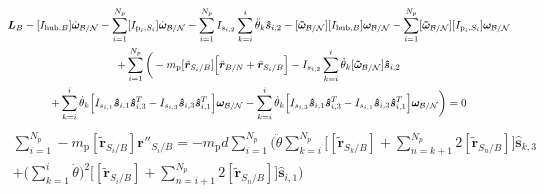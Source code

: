 \begin{multline}
	\bm L_B -[I_{\text{hub},B}] \dot{\bm\omega}_{\cal B/N} - \sum\limits_{i=1}^{N_p}[I_{\text{p}_i,S_i}] \dot{\bm\omega}_{\cal B/N} - \sum\limits_{i=1}^{N_p} I_{s_{i,2}}\sum^{i}_{k=i} \ddot{\theta}_k \bm{\hat{s}}_{i,2} -[\bm{\tilde{\omega}}_{\cal B/N}] [I_{\text{hub},B}] \bm\omega_{\cal B/N} - \sum\limits_{i=1}^{N_p}[\bm{\tilde{\omega}}_{\cal B/N}] [I_{\text{p}_i,S_i}] \bm\omega_{\cal B/N} \\
	+ \sum\limits_{i=1}^{N_p}\bigg(- m_{\text{p}} [\tilde{{\bm r}}_{S_{i}/B}] \Big[\ddot{\bm r}_{B/N} + \ddot{\bm r}_{S_{i}/B}\Big]
	- I_{s_{i,2}} \sum^{i}_{k=i} \dot{\theta}_k [\bm{\tilde{\omega}}_{\cal B/N}] \bm{\hat{s}}_{i,2} \\
	+ \sum^{i}_{k=i} \dot{\theta}_k \Big[I_{s_{i,1}}\bm{\hat{s}}_{i,1} \bm{\hat{s}}_{i,3}^T -  I_{s_{i,3}} \bm{\hat{s}}_{i,3} \bm{\hat{s}}_{i,1}^T\Big] \bm\omega_{\cal B/N} -  \sum^{i}_{k=i} \dot{\theta}_k \Big[I_{s_{i,3}}\bm{\hat{s}}_{i,1} \bm{\hat{s}}_{i,3}^T -  I_{s_{i,1}} \bm{\hat{s}}_{i,3} \bm{\hat{s}}_{i,1}^T\Big] \bm\omega_{\cal B/N} \bigg) = 0
\end{multline}
\begin{multline}
	\sum\limits_{i=1}^{N_p} - m_{\text{p}} [\tilde{{\bm r}}_{S_{i}/B}] \bm r''_{S_{i}/B} = -m_{\text{p}} d \sum\limits_{i=1}^{N_p} \Bigg(\ddot{\theta}\sum\limits_{k=i}^{N_p}\Big[ [\tilde{{\bm r}}_{S_{k}/B}] + \sum\limits_{n=k+1}^{N_p}2[\tilde{{\bm r}}_{S_{n}/B}]\Big]\bm{\hat{s}}_{k,3} \\
	+ \Big( \sum\limits_{k=1}^{i} \dot{\theta}\Big)^2 \Big[[\tilde{{\bm r}}_{S_{i}/B}] + \sum\limits_{n=i+1}^{N_p}2[\tilde{{\bm r}}_{S_{n}/B}]\Big]\bm{\hat{s}}_{i,1} \Bigg)
\end{multline}
